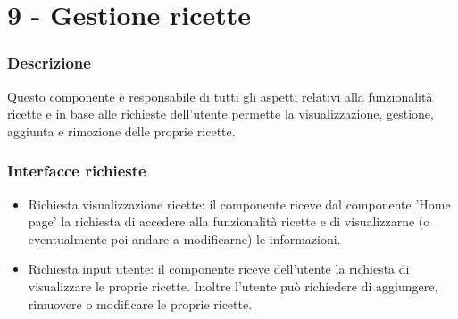 \documentclass[a4paper,12pt]{article}
\begin{document}
\section*{9 -  Gestione ricette}
\subsubsection*{Descrizione}
Questo componente è responsabile di tutti gli aspetti relativi alla funzionalità ricette e in base alle richieste dell'utente permette la visualizzazione, gestione, aggiunta e rimozione delle proprie ricette.
\subsubsection*{Interfacce richieste}
\begin{itemize} \setlength\itemsep{0.01em}
\item {\sffamily Richiesta visualizzazione ricette}: il componente riceve dal componente 'Home page'  la richiesta di accedere alla funzionalità ricette e di visualizzarne (o eventualmente poi andare a modificarne) le informazioni.
\item {\sffamily Richiesta input utente}: il componente riceve dell'utente la richiesta di visualizzare le proprie ricette. Inoltre l'utente può richiedere di aggiungere, rimuovere o modificare le proprie ricette.

\end{itemize}
\end{document}
